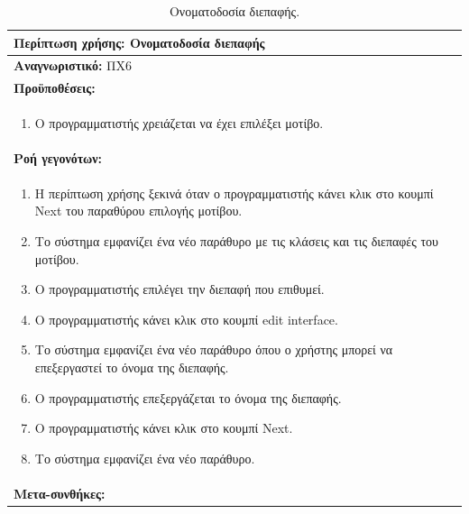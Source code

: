 \begin{table}[H]
	\hspace*{-0.2cm}
    \centering
    \scriptsize
	\begin{tabular}{|p{10cm}|}
	\hline
		\textbf{Περίπτωση χρήσης:} Ονοματοδοσία διεπαφής  \\
	\hline
		\textbf{Αναγνωριστικό:} ΠΧ6 \\
	\hline	
		\textbf{Προϋποθέσεις:} \\
		\begin{enumerate}
		 \item Ο προγραμματιστής χρειάζεται να έχει επιλέξει μοτίβο.
		\end{enumerate} \\
	\hline
		\textbf{Ροή γεγονότων:} \\
		\begin{enumerate}
			\item Η περίπτωση χρήσης ξεκινά όταν ο προγραμματιστής κάνει κλικ στο κουμπί Next του παραθύρου επιλογής μοτίβου.
			\item Το σύστημα εμφανίζει ένα νέο παράθυρο με τις κλάσεις και τις διεπαφές του μοτίβου.
			\item Ο προγραμματιστής επιλέγει την διεπαφή που επιθυμεί.
			\item Ο προγραμματιστής κάνει κλικ στο κουμπί edit interface.
			 \item Το σύστημα εμφανίζει ένα νέο παράθυρο όπου ο χρήστης μπορεί να επεξεργαστεί το όνομα της διεπαφής.
			 \item Ο προγραμματιστής επεξεργάζεται το όνομα της διεπαφής.
			 \item Ο προγραμματιστής κάνει κλικ στο κουμπί Next.
			 \item Το σύστημα εμφανίζει ένα νέο παράθυρο.
		\end{enumerate} \\
	\hline
		\textbf{Μετα-συνθήκες:} \\
	\hline
    \end{tabular}
    \caption{Ονοματοδοσία διεπαφής.}
    \label{tab:nameInterfaceUC}
\end{table}
